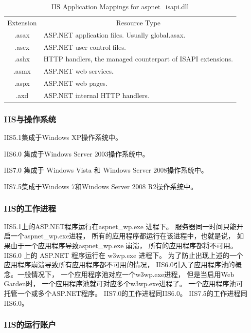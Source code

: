 \documentclass{book}
\begin{document}
\begin{table}\caption[Caption for LOF]{IIS Application Mappings for aspnet\_isapi.dll}
\label{table:IISApplicationMappings}					
	\medskip
	\centering		
	\begin{tabular}{|c|l|}
		\hline
		\multirow{1}{*}{Extension}		
		& \multicolumn{1}{c|}{Resource Type}\\			
		\cline{1-2}
		 .asax &  ASP.NET application files. Usually global.asax.\\
		\hline
		 .ascx & ASP.NET user control files.\\
		\hline
		 .ashx & HTTP handlers, the managed counterpart of ISAPI extensions.\\
		\hline
		 .asmx & ASP.NET web services.\\
		\hline
		 .aspx & ASP.NET web pages.\\
		\hline
		 .axd & ASP.NET internal HTTP handlers.\\
		 \hline
	\end{tabular}
\end{table}

\subsubsection{IIS与操作系统} 

IIS5.1集成于Windows XP操作系统中。

IIS6.0 集成于Windows Server 2003操作系统中。

IIS7.0 集成于 Windows Vista 和 Windows Server 2008操作系统中。

IIS7.5集成于Windows 7和Windows Server 2008 R2操作系统中。

\subsubsection{IIS的工作进程}

IIS5.1上的ASP.NET程序运行在aspnet\_wp.exe 进程下。
服务器同一时间只能开启一个aspnet\_wp.exe进程，
所有的应用程序都运行在该进程中，也就是说，
如果由于一个应用程序导致aspnet\_wp.exe 崩溃，
所有的应用程序都将不可用。
IIS6.0 上的 ASP.NET 程序运行在 w3wp.exe 进程下。
为了防止出现上述的一个应用程序崩溃导致所有应用程序都不可用的情况，
IIS6.0引入了应用程序池的概念。一般情况下，
一个应用程序池对应一个w3wp.exe进程，
但是当启用Web Garden时，
一个应用程序池就可对应多个w3wp.exe进程了。
一个应用程序池可托管一个或多个ASP.NET程序。
IIS7.0的工作进程同IIS6.0。
IIS7.5的工作进程同IIS6.0。

\subsubsection{IIS的运行账户}
\end{document}
